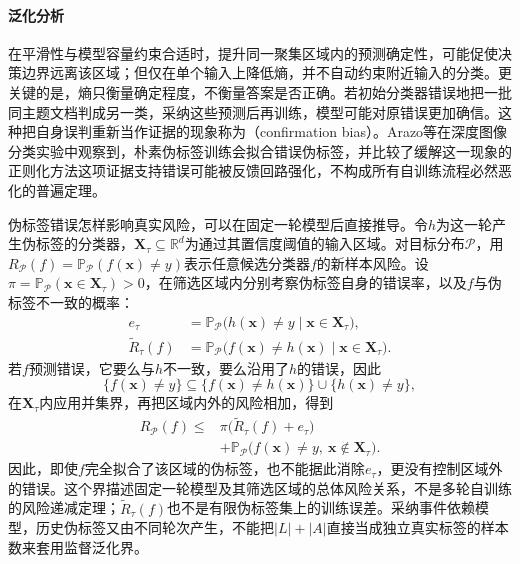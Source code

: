 \paragraph{泛化分析}
在平滑性与模型容量约束合适时，提升同一聚集区域内的预测确定性，可能促使决策边界远离该区域；但仅在单个输入上降低熵，并不自动约束附近输入的分类。更关键的是，熵只衡量确定程度，不衡量答案是否正确。若初始分类器错误地把一批同主题文档判成另一类，采纳这些预测后再训练，模型可能对原错误更加确信。这种把自身误判重新当作证据的现象称为（confirmation bias）。Arazo等在深度图像分类实验中观察到，朴素伪标签训练会拟合错误伪标签，并比较了缓解这一现象的正则化方法这项证据支持错误可能被反馈回路强化，不构成所有自训练流程必然恶化的普遍定理。

伪标签错误怎样影响真实风险，可以在固定一轮模型后直接推导。令$h$为这一轮产生伪标签的分类器，$\bm{X}_\tau\subseteq\mathbb{R}^{d}$为通过其置信度阈值的输入区域。对目标分布$\mathcal{P}$，用$R_{\mathcal{P}}(f)=\mathbb{P}_{\mathcal{P}}(f(\bm{x})\ne y)$表示任意候选分类器$f$的新样本风险。设$\pi=\mathbb{P}_{\mathcal{P}}(\bm{x}\in\bm{X}_\tau)>0$，在筛选区域内分别考察伪标签自身的错误率，以及$f$与伪标签不一致的概率：
\begin{equation}
  \label{eq:classification-self-training-conditional-risks}
  \begin{aligned}
    e_\tau
      &=\mathbb{P}_{\mathcal{P}}
        \bigl(h(\bm{x})\ne y\mid\bm{x}\in\bm{X}_\tau\bigr),\\
    \widetilde R_\tau(f)
      &=\mathbb{P}_{\mathcal{P}}
        \bigl(f(\bm{x})\ne h(\bm{x})\mid\bm{x}\in\bm{X}_\tau\bigr).
  \end{aligned}
\end{equation}
若$f$预测错误，它要么与$h$不一致，要么沿用了$h$的错误，因此
\begin{equation}
  \label{eq:classification-self-training-error-events}
  \{f(\bm{x})\ne y\}
    \subseteq
    \{f(\bm{x})\ne h(\bm{x})\}
    \cup\{h(\bm{x})\ne y\},
\end{equation}
在$\bm{X}_\tau$内应用并集界，再把区域内外的风险相加，得到
\begin{equation}
  \label{eq:classification-self-training-risk}
  \begin{aligned}
    R_{\mathcal{P}}(f)
      \leq{}&\pi\bigl(\widetilde R_\tau(f)+e_\tau\bigr)\\
      &+\mathbb{P}_{\mathcal{P}}
        \bigl(f(\bm{x})\ne y,\ \bm{x}\notin\bm{X}_\tau\bigr).
  \end{aligned}
\end{equation}
因此，即使$f$完全拟合了该区域的伪标签，也不能据此消除$e_\tau$，更没有控制区域外的错误。这个界描述固定一轮模型及其筛选区域的总体风险关系，不是多轮自训练的风险递减定理；$\widetilde R_\tau(f)$也不是有限伪标签集上的训练误差。采纳事件依赖模型，历史伪标签又由不同轮次产生，不能把$|L|+|A|$直接当成独立真实标签的样本数来套用监督泛化界。


